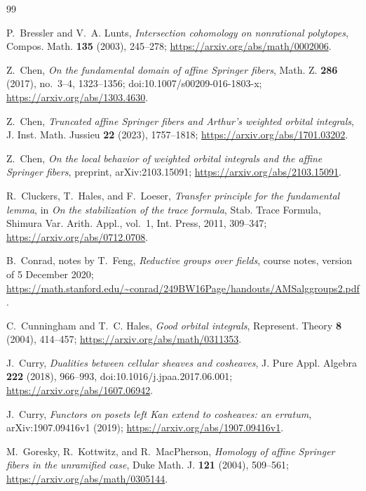 \documentclass[11pt]{article}
\theoremstyle{definition}
\theoremstyle{remark}
\begin{document}
\begin{thebibliography}{99}

P.~Bressler and V.~A. Lunts,
\emph{Intersection cohomology on nonrational polytopes},
Compos. Math. \textbf{135} (2003), 245--278;
\url{https://arxiv.org/abs/math/0002006}.

Z.~Chen,
\emph{On the fundamental domain of affine Springer fibers},
Math. Z. \textbf{286} (2017), no.~3--4, 1323--1356;
doi:10.1007/s00209-016-1803-x;
\url{https://arxiv.org/abs/1303.4630}.

Z.~Chen,
\emph{Truncated affine Springer fibers and Arthur's weighted orbital
integrals},
J. Inst. Math. Jussieu \textbf{22} (2023), 1757--1818;
\url{https://arxiv.org/abs/1701.03202}.

Z.~Chen,
\emph{On the local behavior of weighted orbital integrals and the affine
Springer fibers},
preprint, arXiv:2103.15091;
\url{https://arxiv.org/abs/2103.15091}.

R.~Cluckers, T.~Hales, and F.~Loeser,
\emph{Transfer principle for the fundamental lemma},
in \emph{On the stabilization of the trace formula}, Stab. Trace Formula,
Shimura Var. Arith. Appl., vol.~1, Int. Press, 2011, 309--347;
\url{https://arxiv.org/abs/0712.0708}.

B.~Conrad, notes by T.~Feng,
\emph{Reductive groups over fields},
course notes, version of 5 December 2020;
\url{https://math.stanford.edu/~conrad/249BW16Page/handouts/AMSalggroups2.pdf}.

C.~Cunningham and T.~C. Hales,
\emph{Good orbital integrals},
Represent. Theory \textbf{8} (2004), 414--457;
\url{https://arxiv.org/abs/math/0311353}.

J.~Curry,
\emph{Dualities between cellular sheaves and cosheaves},
J. Pure Appl. Algebra \textbf{222} (2018), 966--993,
doi:10.1016/j.jpaa.2017.06.001;
\url{https://arxiv.org/abs/1607.06942}.

J.~Curry,
\emph{Functors on posets left Kan extend to cosheaves: an erratum},
arXiv:1907.09416v1 (2019);
\url{https://arxiv.org/abs/1907.09416v1}.

M.~Goresky, R.~Kottwitz, and R.~MacPherson,
\emph{Homology of affine Springer fibers in the unramified case},
Duke Math. J. \textbf{121} (2004), 509--561;
\url{https://arxiv.org/abs/math/0305144}.


\end{thebibliography}
\end{document}
